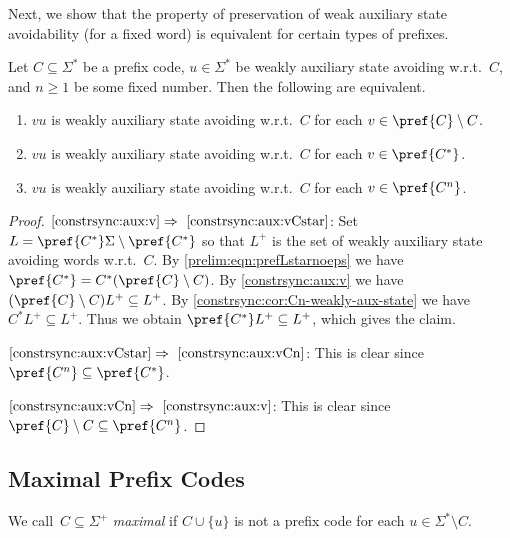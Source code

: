 Next, we show that the property of preservation of weak auxiliary state avoidability (for a fixed word)
is equivalent for certain types of prefixes.

\begin{proposition}	\label{constrsync:prop:vu}
	Let $C \subseteq \Sigma^*$ be a prefix code, $u \in \Sigma^*$ be weakly auxiliary state avoiding w.r.t.~$C$,
	and $n \ge 1$ be some fixed number.
	Then the following are equivalent.	 
	\begin{enumerate}
	\item \label{constrsync:aux:v} $vu$ is weakly auxiliary state avoiding  w.r.t.~$C$ 
	for each $v \in \pref{C} \setminus C$.		
		
	\item \label{constrsync:aux:vCstar} $vu$ is weakly auxiliary state avoiding  w.r.t.~$C$ for each $v \in \pref{C^*}$.
		
	\item \label{constrsync:aux:vCn} $vu$ is weakly auxiliary state avoiding  w.r.t.~$C$ for each $v \in \pref{C^n}$.
	\end{enumerate} 
\end{proposition} 
\begin{proof}
	$\ref{constrsync:aux:v} \Rightarrow~\ref{constrsync:aux:vCstar}$: 
	Set $L = \pref{C^*}\Sigma \setminus \pref{C^*}$ so that $L^+$ is the set of weakly auxiliary state avoiding words w.r.t.~$C$. 
	By \cref{prelim:eqn:prefLstarnoeps} 
	we have $\pref{C^*} = C^* (\pref{C} \setminus C)$.
	By \cref{constrsync:aux:v}
	we have $(\pref{C} \setminus C) L^+ \subseteq L^+$.
	By \cref{constrsync:cor:Cn-weakly-aux-state} 
	we have $C^* L^+ \subseteq L^+$.
	Thus we obtain  $\pref{C^*}L^+ \subseteq L^+$,
	which gives the claim.
	
	$\ref{constrsync:aux:vCstar} \Rightarrow~\ref{constrsync:aux:vCn}$: This is clear
	since $\pref{C^n} \subseteq \pref{C^*}$.
	
	$\ref{constrsync:aux:vCn} \Rightarrow~\ref{constrsync:aux:v}$: This is clear
	since $\pref{C} \setminus C \subseteq \pref{C^n}$.
\end{proof}

\subsection{Maximal Prefix Codes}
\label{constrsync:sec:max-prefix-codes}

We call~$C \subseteq \Sigma^+$ \emph{maximal} if $C \cup \{u\}$ is not a prefix code for each $u \in \Sigma^* \setminus C$.

